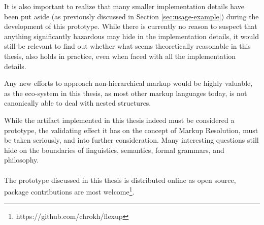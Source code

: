 \documentclass{scrreprt}
\begin{document}
It is also important to realize that many smaller implementation details have been put aside (as previously discussed in Section \ref{sec:usage-example}) during the development of this prototype. While there is currently no reason to suspect that anything significantly hazardous may hide in the implementation details, it would still be relevant to find out whether what seems theoretically reasonable in this thesis, also holds in practice, even when faced with all the implementation details.

Any new efforts to approach non-hierarchical markup would be highly valuable, as the eco-system in this thesis, as most other markup languages today, is not canonically able to deal with nested structures.

While the artifact implemented in this thesis indeed must be considered a prototype, the validating effect it has on the concept of Markup Resolution, must be taken seriously, and into further consideration. Many interesting questions still hide on the boundaries of linguistics, semantics, formal grammars, and philosophy.\\ \\

The prototype discussed in this thesis is distributed online as open source, package contributions are most welcome\footnote{ https://github.com/chrokh/flexup}.













%
%
%
%
%
%



\end{document}
